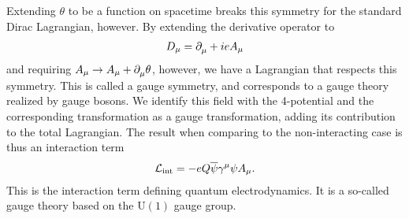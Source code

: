 Extending $\theta$ to be a function on spacetime breaks this symmetry for the standard Dirac Lagrangian, however. By extending the derivative operator to
\begin{align*}
	D_{\mu} = \partial^{}_{\mu} + ieA_{\mu}
\end{align*}
and requiring $A_{\mu}\to A_{\mu} + \partial^{}_{\mu}\theta$, however, we have a Lagrangian that respects this symmetry. This is called a gauge symmetry, and corresponds to a gauge theory realized by gauge bosons. We identify this field with the 4-potential and the corresponding transformation as a gauge transformation, adding its contribution to the total Lagrangian. The result when comparing to the non-interacting case is thus an interaction term
\begin{align*}
	\mathcal{L}_{\text{int}} = -eQ\overline{\psi}\gamma^{\mu}\psi A_{\mu}.
\end{align*}
This is the interaction term defining quantum electrodynamics. It is a so-called gauge theory based on the $\text{U}(1)$ gauge group.
